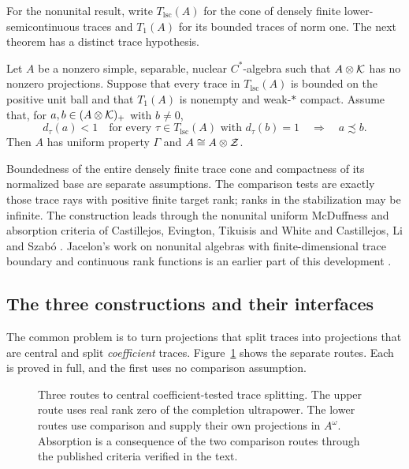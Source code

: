 For the nonunital result, write $T_{\mathrm{lsc}}(A)$ for the cone of densely
finite lower-semicontinuous traces and $T_1(A)$ for its bounded traces of
norm one. The next theorem has a distinct trace hypothesis.

\begin{theorem}\label{n:thm:main}
Let $A$ be a nonzero simple, separable, nuclear $C^*$-algebra such that
$A\otimes\mathcal K$ has no nonzero projections. Suppose that every trace in
$T_{\mathrm{lsc}}(A)$ is bounded on the positive unit ball and that
$T_1(A)$ is nonempty and weak-$*$ compact. Assume that, for
$a,b\in(A\otimes\mathcal K)_+$ with $b\ne0$,
\[
 d_\tau(a)<1\quad
 \text{for every }\tau\in T_{\mathrm{lsc}}(A)
 \text{ with }d_\tau(b)=1
 \quad\Longrightarrow\quad a\precsim b.
\]
Then $A$ has uniform property $\Gamma$ and $A\cong A\otimes\mathcal Z$.
\end{theorem}

Boundedness of the entire densely finite trace cone and compactness of its
normalized base are separate assumptions. The comparison tests are exactly
those trace rays with positive finite target rank; ranks in the stabilization
may be infinite. The construction leads through the nonunital uniform
McDuffness and absorption criteria of Castillejos, Evington, Tikuisis and
White \cite{CETW} and Castillejos, Li and Szab\'o \cite{CLS}. Jacelon's work
on nonunital algebras with finite-dimensional trace boundary and continuous
rank functions is an earlier part of this development \cite{Jacelon}.

\subsection{The three constructions and their interfaces}

The common problem is to turn projections that split traces into projections
that are central and split \emph{coefficient} traces. Figure~\ref{fig:routes}
shows the separate routes. Each is proved in full, and the first uses no
comparison assumption.

\begin{figure}[htbp]
\centering

\caption{Three routes to central coefficient-tested trace splitting. The
upper route uses real rank zero of the completion ultrapower. The lower
routes use comparison and supply their own projections in $A^\omega$.
Absorption is a consequence of the two comparison routes through the
published criteria verified in the text.}
\label{fig:routes}
\end{figure}

